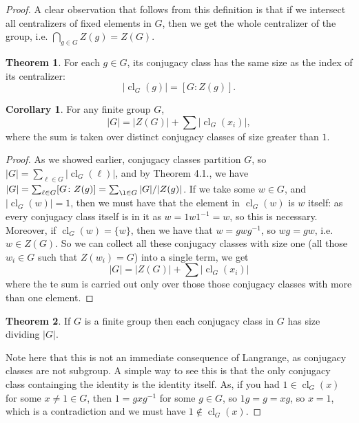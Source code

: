 \documentclass[9pt,reqno]{amsart}
\theoremstyle{definition}
\newtheorem{theorem}{Theorem}[section]
\newtheorem{rem}{Remark}[section]
\newtheorem{coro}{Corollary}[section]
\DeclareMathOperator{\cl}{cl}
\begin{document}
\begin{proof}
A clear observation that follows from this definition is that if we intersect all centralizers of fixed elements in $G$, then we get the whole centralizer of the group, i.e. $\bigcap_{g \in G} Z(g) = Z(G)$. 
\begin{theorem}
	For each $g \in G$, its conjugacy class has the same size as the index of its centralizer:
	$$| \cl_G (g) | = [G \colon Z(g) ].$$
\end{theorem}
\begin{coro}
For any finite group $G$,  $$ |G| = |Z(G)| + \sum |\cl_G(x_i)|,$$ where the sum is taken over distinct conjugacy classes of size greater than $1$.
\end{coro}
\begin{proof}
	As we showed earlier, conjugacy classes partition $G$, so $|G| = \sum_{ \ell \in G} |\cl_G ( \ell)|$, and by Theorem 4.1., we have $|G| = \sum_{ \ell \in G} [G \colon Z(g) ] = \sum_{\l \in G } |G|/ |Z(g)|$. If we take some $w \in G$, and $ | \cl_G(w) | = 1$, then we must have that the element in $\cl_G(w) $ is $w$ itself: as every conjugacy class itself is in it as $w = 1 w 1^{-1} = w$, so this is necessary. Moreover, if $\cl_G( w) = \{ w \}$, then we have that $w = gwg^{-1}$, so $w g = gw$, i.e. $w \in Z(G)$. So we can collect all these conjugacy classes with size one (all those $w_i \in G$ such that $Z(w_i) = G$) into a single term, we get $$|G| = |Z(G)| + \sum |\cl_G(x_i)|$$ where the te sum is carried out only over those those conjugacy classes with more than one element. 
\end{proof}
\begin{theorem}
	If $G$ is a finite group then each conjugacy class in $G$ has size dividing $|G|$.
\end{theorem}
Note here that this is not an immediate consequence of Langrange, as conjugacy classes are not subgroup. A simple way to see this is that the only conjugacy class containging the identity is the identity itself. As, if you had $1 \in \cl_G(x)$ for some $x \neq 1 \in G$, then $1 = gxg^{-1}$ for some $g \in G$, so $1g = g = xg$, so $x = 1$, which is a contradiction and we must have $1 \notin \cl_G (x)$.  



\end{proof}
\end{document}
